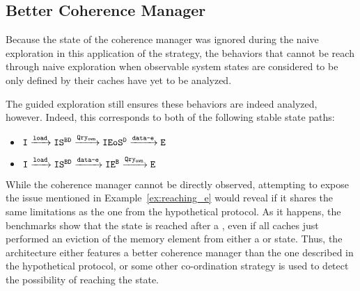 \subsection{Better Coherence Manager}
Because the state of the coherence manager was ignored during the naive
exploration in this application of the strategy, the behaviors that cannot be
reach through naive exploration when observable system states are considered to
be only defined by their caches have yet to be analyzed.

The guided exploration still ensures these behaviors are indeed analyzed,
however. Indeed, this corresponds to both of the following stable state paths:
\begin{itemize}
\item $\texttt{I} \xrightarrow[]{\text{\texttt{load}}{}}
\texttt{IS}^\texttt{BD} \xrightarrow[]{\text{\texttt{Qry\textsubscript{own}}}{}}
\texttt{IEoS}^\texttt{D} \xrightarrow[]{\text{\texttt{data-e}}{}}
\texttt{E}$
\item $\texttt{I} \xrightarrow[]{\text{\texttt{load}}{}}
\texttt{IS}^\texttt{BD} \xrightarrow[]{\text{\texttt{data-e}}{}}
\texttt{IE}^\texttt{B} \xrightarrow[]{\text{\texttt{Qry\textsubscript{own}}}{}}
\texttt{E}$
\end{itemize}

While the coherence manager cannot be directly observed, attempting to expose
the issue mentioned in Example~\ref{ex:reaching_e} would reveal if it shares the
same limitations as the one from the hypothetical protocol. As it happens, the
benchmarks show that the \benche{} state is reached after a \loadinstr{}, even
if all caches just performed an eviction of the memory element from either
a \benchts{} or \benchf{} state. Thus, the architecture either features a better
coherence manager than the one described in the hypothetical protocol, or some
other co-ordination strategy is used to detect the possibility of reaching
the \benche{} state.
